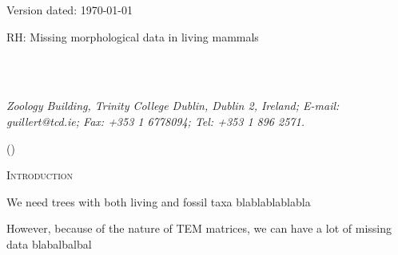 \documentclass[12pt,letterpaper]{article}
\renewcommand{\section}[1]{%
\bigskip
\begin{center}
\begin{Large}
\normalfont\scshape #1
\medskip
\end{Large}
\end{center}}
\begin{document}
\begin{flushright}
Version dated: \today
\end{flushright}
\bigskip
\noindent RH: Missing morphological data in living mammals

\bigskip
\medskip
\begin{center}


\bigskip

\\
\\
\end{center}
\medskip
{} \textit{Zoology Building, Trinity College Dublin, Dublin 2, Ireland; E-mail: guillert@tcd.ie; Fax: +353 1 6778094; Tel: +353 1 896 2571.}\\
\vspace{1in}

\modulolinenumbers[1]
\linenumbers

%
%

\newpage
\begin{abstract}

\end{abstract}

\noindent ()\\

\vspace{1.5in}

\newpage 

%
%

\section{Introduction}

We need trees with both living and fossil taxa blablablablabla

However, because of the nature of TEM matrices, we can have a lot of missing data blabalbalbal
\end{document}
